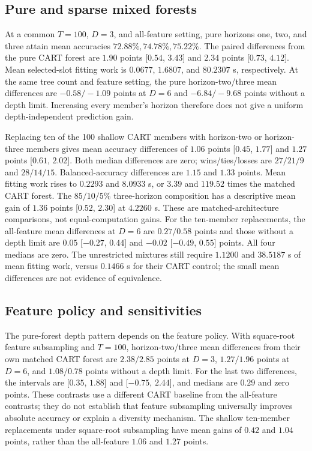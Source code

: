 \subsection{Pure and sparse mixed forests}
At a common $T=100$, $D=3$, and all-feature setting, pure horizons one,
two, and three attain mean accuracies $72.88\%,74.78\%,75.22\%$.
The paired differences from the pure CART forest are $1.90$ points
[$0.54$, $3.43$] and $2.34$ points [$0.73$, $4.12$]. Mean selected-slot
fitting work is $0.0677$, $1.6807$, and $80.2307$ s, respectively.
At the same tree count and feature setting, the pure horizon-two/three
mean differences are $-0.58/-1.09$ points at $D=6$ and
$-6.84/-9.68$ points without a depth limit. Increasing every member's
horizon therefore does not give a uniform depth-independent prediction gain.

Replacing ten of the 100 shallow CART members with horizon-two or
horizon-three members gives mean accuracy differences of $1.06$ points
[$0.45$, $1.77$] and $1.27$ points [$0.61$, $2.02$]. Both median
differences are zero; wins/ties/losses are $27/21/9$ and $28/14/15$.
Balanced-accuracy differences are $1.15$ and $1.33$ points. Mean fitting
work rises to $0.2293$ and $8.0933$ s, or $3.39$ and $119.52$ times
the matched CART forest. The $85/10/5\%$ three-horizon composition has
a descriptive mean gain of $1.36$ points [$0.52$, $2.30$] at $4.2260$ s.
These are matched-architecture comparisons, not equal-computation gains.
For the ten-member replacements, the all-feature mean differences at
$D=6$ are $0.27/0.58$ points and those without a depth limit are
$0.05$ [$-0.27$, $0.44$] and $-0.02$ [$-0.49$, $0.55$] points.
All four medians are zero. The unrestricted mixtures still require
$1.1200$ and $38.5187$ s of mean fitting work, versus $0.1466$ s for
their CART control; the small mean differences are not evidence of
equivalence.

\subsection{Feature policy and sensitivities}
The pure-forest depth pattern depends on the feature policy. With
square-root feature subsampling and $T=100$, horizon-two/three mean
differences from their own matched CART forest are $2.38/2.85$ points
at $D=3$, $1.27/1.96$ points at $D=6$, and $1.08/0.78$ points without
a depth limit. For the last two differences, the intervals are
[$0.35$, $1.88$] and [$-0.75$, $2.44$], and medians are $0.29$ and
zero points. These contrasts use a different CART baseline from the
all-feature contrasts; they do not establish that feature subsampling
universally improves absolute accuracy or explain a diversity mechanism.
The shallow ten-member replacements under square-root subsampling have
mean gains of $0.42$ and $1.04$ points, rather than the all-feature
$1.06$ and $1.27$ points.


